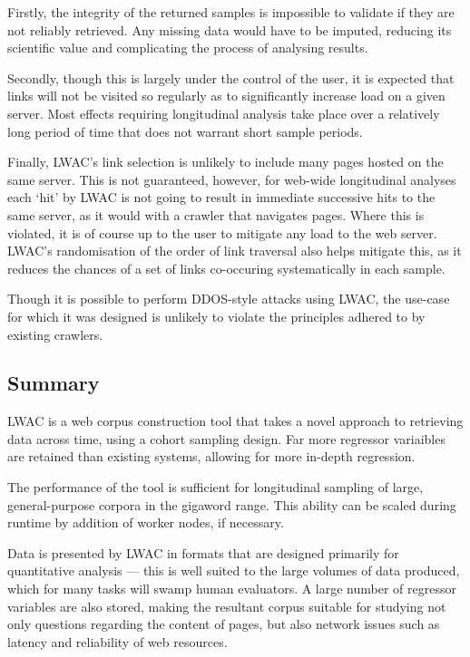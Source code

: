 Firstly, the integrity of the returned samples is impossible to validate if they are not reliably retrieved.  Any missing data would have to be imputed, reducing its scientific value and complicating the process of analysing results.

Secondly, though this is largely under the control of the user, it is expected that links will not be visited so regularly as to significantly increase load on a given server.  Most effects requiring longitudinal analysis take place over a relatively long period of time that does not warrant short sample periods.

Finally, LWAC's link selection is unlikely to include many pages hosted on the same server.  This is not guaranteed, however, for web-wide longitudinal analyses each `hit' by LWAC is not going to result in immediate successive hits to the same server, as it would with a crawler that navigates pages.  Where this is violated, it is of course up to the user to mitigate any load to the web server.  LWAC's randomisation of the order of link traversal also helps mitigate this, as it reduces the chances of a set of links co-occuring systematically in each sample.

Though it is possible to perform DDOS-style attacks using LWAC, the use-case for which it was designed is unlikely to violate the principles adhered to by existing crawlers.





\subsection{Summary}

LWAC is a web corpus construction tool that takes a novel approach to retrieving data across time, using a cohort sampling design.  Far more regressor variaibles are retained than existing systems, allowing for more in-depth regression.

The performance of the tool is sufficient for longitudinal sampling of large, general-purpose corpora in the gigaword range.  This ability can be scaled during runtime by addition of worker nodes, if necessary.

Data is presented by LWAC in formats that are designed primarily for quantitative analysis --- this is well suited to the large volumes of data produced, which for many tasks will swamp human evaluators.  A large number of regressor variables are also stored, making the resultant corpus suitable for studying not only questions regarding the content of pages, but also network issues such as latency and reliability of web resources.



